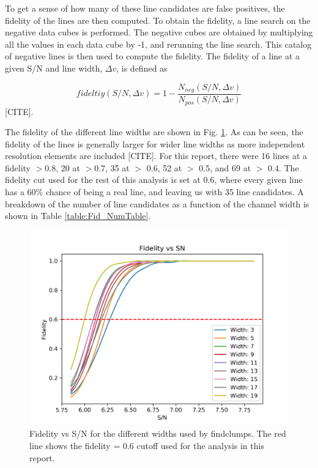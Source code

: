 To get a sense of how many of these line candidates are false positives, the fidelity of the lines are then computed. To obtain the fidelity, a line search on the negative data cubes is performed. The negative cubes are obtained by multiplying all the values in each data cube by -1, and rerunning the line search. This catalog of negative lines is then used to compute the fidelity. The fidelity of a line at a given S/N and line width, $\Delta v$, is defined as 

$$ fideltiy(S/N, \Delta v) = 1 - \frac{N_{neg}(S/N, \Delta v)}{N_{pos}(S/N, \Delta v)} $$ [CITE].

The fidelity of the different line widths are shown in Fig. \ref{fig:Fid_map}. As can be seen, the fidelity of the lines is generally larger for wider line widths as more independent resolution elements are included [CITE]. For this report, there were 16 lines at a fidelity $>$0.8, 20 at $>$0.7, 35 at $>$ 0.6, 52 at $>$ 0.5, and 69 at $>$ 0.4. The fidelity cut used for the rest of this analysis is set at 0.6, where every given line has a 60\% chance of being a real line, and leaving us with 35 line candidates. A breakdown of the number of line candidates as a function of the channel width is shown in Table \ref{table:Fid_NumTable}. 

\begin{figure}[tbp]
\centering \includegraphics[width=120mm]{Fidelity_map.png}
\caption{Fidelity vs S/N for the different widths used by findclumps. The red line shows the fidelity = 0.6 cutoff used for the analysis in this report.}
\label{fig:Fid_map}
\end{figure}

